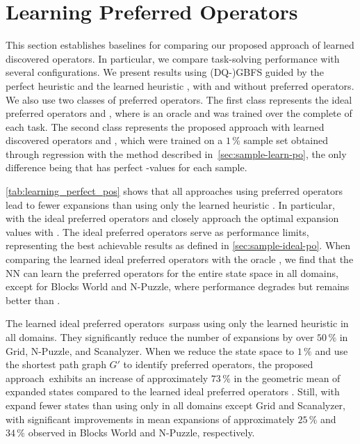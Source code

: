 \documentclass[ppgc,diss,english]{iiufrgs}
\begin{document}
\section{Learning Preferred Operators}
\label{sec:exp-learning-po}
This section establishes baselines for comparing our proposed approach of learned discovered operators. In particular, we compare task-solving performance with several configurations. We present results using (DQ-)GBFS guided by the perfect heuristic \hstar and the learned heuristic \hnn, with and without preferred operators. We also use two classes of preferred operators. The first class represents the ideal preferred operators \postartable and \postar, where \postartable is an oracle and \postar was trained over the complete \fsp of each task. The second class represents the proposed approach with learned discovered operators \pogstar and \pog, which were trained on a $1\,\%$ sample set obtained through regression with the method described in~\cref{sec:sample-learn-po}, the only difference being that \pogstar has perfect \hstar-values for each sample.



\cref{tab:learning_perfect_pos} shows that all approaches using preferred operators lead to fewer expansions than using only the learned heuristic \hnn. In particular, \hnn with the ideal preferred operators \postartable and \postar closely approach the optimal expansion values with \hstar.
The ideal preferred operators serve as performance limits, representing the best achievable results as defined in \cref{sec:sample-ideal-po}. When comparing the learned ideal preferred operators \postar with the oracle \postartable, we find that the NN can learn the preferred operators for the entire state space in all domains, except for Blocks World and N-Puzzle, where performance degrades but remains better than \hnn.

The learned ideal preferred operators~\postar surpass using only the learned heuristic \hnn in all domains. They significantly reduce the number of expansions by over $50\,\%$ in Grid, N-Puzzle, and Scanalyzer. When we reduce the state space to $1\,\%$ and use the shortest path graph $G'$ to identify preferred operators, the proposed approach~\pog exhibits an increase of approximately $73\,\%$ in the geometric mean of expanded states compared to the learned ideal preferred operators \postar. Still, \hnn with \pog expand fewer states than using only \hnn in all domains except Grid and Scanalyzer, with significant improvements in mean expansions of approximately $25\,\%$ and $34\,\%$ observed in Blocks World and N-Puzzle, respectively.
\end{document}
